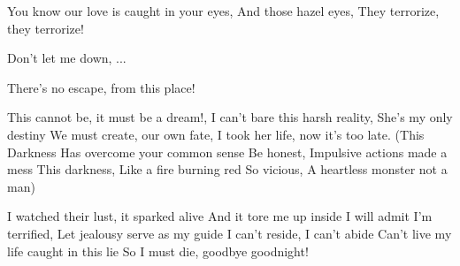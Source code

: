 \beginchorus
You know our love is caught in your eyes, \brk  And those hazel eyes,  \brk  They terrorize, they terrorize!
\endchorus

\beginchorus
Don't let me down, ...
\endchorus

\beginchorus
There's no escape, from this place!
\endchorus

\beginverse
This cannot be, it must be a dream!, \brk  I can't bare this harsh reality, \brk  She's my only destiny
We must create, our own fate, \brk  I took her life, now it's too late. 
(This Darkness Has overcome your common sense
Be honest, Impulsive actions made a mess
This darkness, \brk  Like a fire burning red
So vicious, \brk  A heartless monster not a man)
\endverse

\beginchorus
I watched their lust, it sparked alive
And it tore me up inside
I will admit I'm terrified,
Let jealousy serve as my guide
I can't reside, I can't abide
Can't live my life caught in this lie
So I must die, goodbye goodnight!
\endchorus


\endsong

